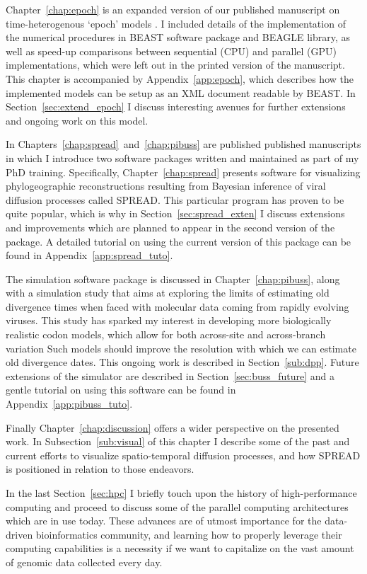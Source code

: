 Chapter~\ref{chap:epoch} is an expanded version of our published manuscript on time-heterogenous `epoch' models \citep{Bielejec2014a}.
I included details of the implementation of the numerical procedures in BEAST software package and BEAGLE library, as well as speed-up comparisons between sequential (CPU) and parallel (GPU) implementations, which were left out in the printed version of the manuscript.
This chapter is accompanied by Appendix~\ref{app:epoch}, which describes how the implemented models can be setup as an XML document readable by BEAST.
In Section~\ref{sec:extend_epoch} I discuss interesting avenues for further extensions and ongoing work on this model.

In Chapters~\ref{chap:spread}~and~\ref{chap:pibuss} are published published manuscripts in which I introduce two software packages written and maintained as part of my PhD training.
Specifically, Chapter~\ref{chap:spread} presents software for visualizing phylogeographic reconstructions resulting from Bayesian inference of viral diffusion processes called SPREAD.
This particular program has proven to be quite popular, which is why in Section~\ref{sec:spread_exten} I discuss extensions and improvements which are planned to appear in the second version of the package.
A detailed tutorial on using the current version of this package can be found in Appendix~\ref{app:spread_tuto}.

The {\bussname} simulation software package is discussed in Chapter~\ref{chap:pibuss}, along with a simulation study that aims at exploring the limits of estimating old divergence times when faced with molecular data coming from rapidly evolving viruses.
This study has sparked my interest in developing more biologically realistic codon models, which allow for both across-site and across-branch variation
Such models should improve the resolution with which we can estimate old divergence dates. %
This ongoing work is described in Section~\ref{sub:dpp}.
Future extensions of the {\bussname} simulator are described in Section~\ref{sec:buss_future} and a gentle tutorial on using this software can be found in Appendix~\ref{app:pibuss_tuto}.

Finally Chapter~\ref{chap:discussion} offers a wider perspective on the presented work. 
In Subsection~\ref{sub:visual} of this chapter I describe some of the past and current efforts to visualize spatio-temporal diffusion processes, and how SPREAD is positioned in relation to those endeavors.

In the last Section~\ref{sec:hpc} I briefly touch upon the history of high-performance computing and proceed to discuss some of the parallel computing architectures which are in use today. 
These advances are of utmost importance for the data-driven bioinformatics community, and learning how to properly leverage their computing capabilities is a necessity if we want to capitalize on the vast amount of genomic data collected every day.









